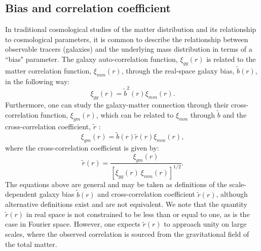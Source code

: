 \documentclass[fleqn,usenatbib]{mnras}
\begin{document}
\subsection{Bias and correlation coefficient}
\label{sec:bias}
In traditional cosmological studies of the matter distribution and its relationship to cosmological parameters, it is common to describe the relationship between observable tracers (galaxies) and the underlying mass distribution in terms of a ``bias" parameter. 
The galaxy auto-correlation function, $\xi_{gg}(r)$ is related to the matter correlation function, $\xi_{mm}(r)$, through the real-space galaxy bias, $\tilde b (r)$, in the following way:
\begin{equation}
    \xi_{gg}(r) = \tilde b^2(r) \xi_{mm}(r).
\end{equation}
Furthermore, one can study the galaxy-matter connection through their cross-correlation function, $\xi_{gm}(r)$, which can be related to $\xi_{mm}$ through $\tilde b$
and the cross-correlation coefficient, 
$\tilde r$ \citep{2008MNRAS.388....2H,2018PhR...733....1D}:
\begin{equation}
    \xi_{gm}(r) = \tilde b(r) \tilde r(r) \xi_{mm}(r),
\end{equation}
where the cross-correlation coefficient is given by:
\begin{equation}
    \tilde r(r) = \frac{\xi_{gm}(r)}{[\xi_{gg}(r) \ \xi_{mm}(r)]^{1/2}}.
\end{equation} 
The equations above are general and may be taken as definitions of the scale-dependent galaxy bias $\tilde b(r)$ and cross-correlation coefficient $\tilde r(r)$, although alternative definitions exist and are not equivalent. We note that the quantity $\tilde r(r)$ in real space is not constrained to be less than or equal to one, as is the case in Fourier space. However, one expects $\tilde r(r)$ to approach unity on large scales,  where the observed correlation is sourced from the gravitational field of the total matter. 
\end{document}
